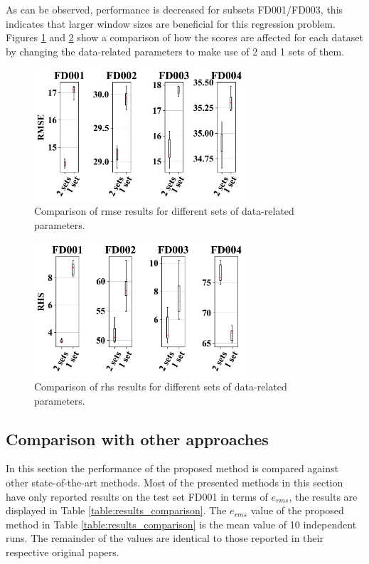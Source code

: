 \documentclass{article}
\begin{document}
As can be observed, performance is decreased for subsets FD001/FD003, this indicates that larger window sizes are beneficial for this regression problem. Figures \ref{fig:scores_rmse} and \ref{fig:scores_rhs} show a comparison of how the scores are affected for each dataset by changing the data-related parameters to make use of 2 and 1 sets of them.

\begin{figure}[!htb]
\centering
\includegraphics[width=0.7\textwidth]{../img/rmse_comparisson.png}
\caption{Comparison of \gls{rmse} results for different sets of data-related parameters.}
\label{fig:scores_rmse}
\end{figure}

\begin{figure}[!htb]
\centering
\includegraphics[width=0.7\textwidth]{../img/rhs_comparisson.png}
\caption{Comparison of \gls{rhs} results for different sets of data-related parameters.}
\label{fig:scores_rhs}
\end{figure}

\subsection{Comparison with other approaches}

In this section the performance of the proposed method is compared against other state-of-the-art methods. Most of the presented methods in this section have only reported results on the test set FD001 in terms of $e_{rms}$, the results are displayed in Table \ref{table:results_comparison}. The $e_{rms}$ value of the proposed method in Table \ref{table:results_comparison} is the mean value of 10 independent runs. The remainder of the values are identical to those reported in their respective original papers.
\end{document}
